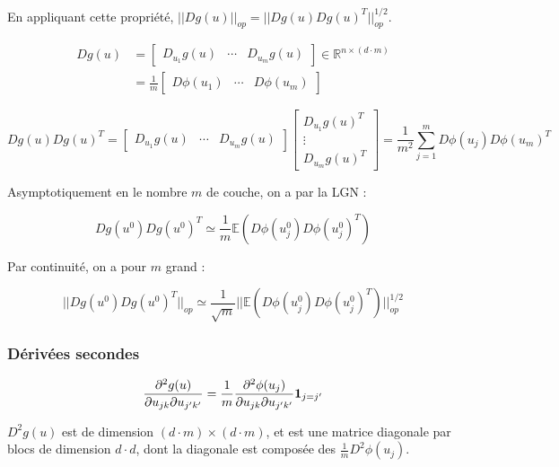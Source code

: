 \documentclass[a4paper, 11pt, french]{article}
\theoremstyle{definition}
\begin{document}
	En appliquant cette propriété, $||Dg(u)||_{op} = ||Dg(u)Dg(u)^T||_{op}^{1/2}$.
	
	\begin{align*}
		Dg(u) &=
		\begin{bmatrix}
			D_{u_1}g(u) & \cdots & D_{u_m}g(u)
		\end{bmatrix} \in \mathbb{R}^{n \times (d\cdot m)}\\
		&= \frac{1}{m} \begin{bmatrix}
			D \phi(u_1) & \cdots & D \phi(u_m)
		\end{bmatrix}
	\end{align*}

	\[ 
	Dg(u) Dg(u)^T =
	\begin{bmatrix}
		D_{u_1}g(u) & \cdots & D_{u_m}g(u)
	\end{bmatrix}
	\begin{bmatrix}
		D_{u_1}g(u)^T \\
		 \vdots \\
		  D_{u_m}g(u)^T
	\end{bmatrix}
	= \frac{1}{m^2} \sum_{j=1}^{m} D \phi(u_j) D \phi(u_m)^T
	\]
	
	Asymptotiquement en le nombre $m$ de couche, on a par la LGN :
	
	\[Dg(u^0) Dg(u^0)^T \simeq \frac{1}{m} \mathbb{E}(D \phi(u^0_j) D \phi(u^0_j)^T)\]
	
	Par continuité, on a pour $m$ grand :
	
	\[||Dg(u^0) Dg(u^0)^T||_{op} \simeq \frac{1}{\sqrt{m}} ||\mathbb{E}(D \phi(u^0_j) D \phi(u^0_j)^T)||_{op}^{1/2}\]
	
	\subsubsection{Dérivées secondes}
	
	\[\frac{\partial^2 g(u)}{\partial u_{jk} \partial u_{j'k'}} = \frac{1}{m} \frac{\partial^2 \phi (u_j)}{\partial u_{jk} \partial u_{j'k'}} {\bf 1}_{j = j'} \]
	
	$D^2 g(u)$ est de dimension $(d\cdot m) \times (d\cdot m)$, et est une matrice diagonale par blocs de dimension $d\cdot d$, dont la diagonale est composée des $\frac{1}{m} D^2 \phi (u_j)$. \\
\end{document}
